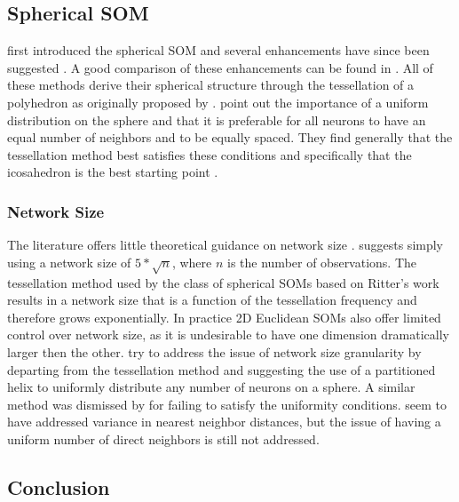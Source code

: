 \documentclass[11pt]{article}
\begin{document}
\subsection{Spherical SOM}
\cite{ritter99} first introduced the spherical SOM and several
enhancements have since been suggested 
\citep{boudjemai2003,sangole03,Nishio:2006fk,Wu:2006lr}.  A good
comparison of these enhancements can be found in \citep{Wu:2006lr}.  All of
these methods derive their spherical structure through the tessellation of a
polyhedron as originally proposed by \citeauthor{ritter99}.  \cite{Wu:2006lr}
point out the importance of a uniform distribution on the sphere and that it is
preferable for all neurons to have an equal number of neighbors and to be
equally spaced.  They find generally that the tessellation method best
satisfies these conditions and specifically that the icosahedron is the best
starting point \citep{wu2005}.

\subsubsection{Network Size}
The literature offers little theoretical guidance on network size
\citep{cho1996}.  \cite{toolbox} suggests simply using a network
size of \(5*\sqrt {n}\), where \(n\) is the number of observations.
The tessellation method used by the class of spherical SOMs
based on Ritter's work results in a network size that is a function of the
tessellation frequency and therefore grows exponentially. In practice 2D
Euclidean SOMs also offer limited control over network size, as it is
undesirable to have one dimension dramatically larger then the other.
\cite{Nishio:2006fk} try to address the issue of network size granularity by
departing from the tessellation method and suggesting the use of a partitioned
helix to uniformly distribute any number of neurons on a sphere.  A similar
method was dismissed by \cite{wu2005} for failing to satisfy the uniformity
conditions.  \citeauthor{Nishio:2006fk} seem to have addressed variance in 
nearest neighbor distances, but the issue of having a uniform number of direct
neighbors is still not addressed.

\subsection{Conclusion}
\end{document}
